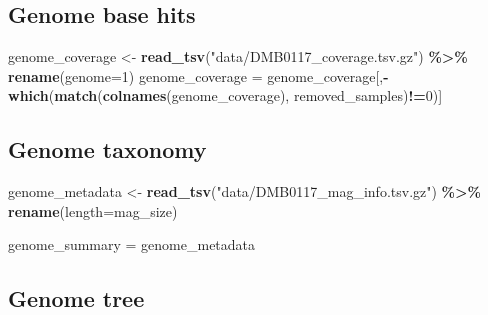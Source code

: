 \documentclass[
]{book}
\newenvironment{Shaded}{\begin{snugshade}}{\end{snugshade}}
\newcommand{\AttributeTok}[1]{\textcolor[rgb]{0.13,0.29,0.53}{#1}}
\newcommand{\CommentTok}[1]{\textcolor[rgb]{0.56,0.35,0.01}{\textit{#1}}}
\newcommand{\DecValTok}[1]{\textcolor[rgb]{0.00,0.00,0.81}{#1}}
\newcommand{\FunctionTok}[1]{\textcolor[rgb]{0.13,0.29,0.53}{\textbf{#1}}}
\newcommand{\NormalTok}[1]{#1}
\newcommand{\OtherTok}[1]{\textcolor[rgb]{0.56,0.35,0.01}{#1}}
\newcommand{\SpecialCharTok}[1]{\textcolor[rgb]{0.81,0.36,0.00}{\textbf{#1}}}
\newcommand{\StringTok}[1]{\textcolor[rgb]{0.31,0.60,0.02}{#1}}
\begin{document}
\subsection{Genome base hits}\label{genome-base-hits}

\begin{Shaded}
\begin{Highlighting}[]
\NormalTok{genome\_coverage }\OtherTok{\textless{}{-}} \FunctionTok{read\_tsv}\NormalTok{(}\StringTok{"data/DMB0117\_coverage.tsv.gz"}\NormalTok{) }\SpecialCharTok{\%\textgreater{}\%}
    \FunctionTok{rename}\NormalTok{(}\AttributeTok{genome=}\DecValTok{1}\NormalTok{)}
\NormalTok{genome\_coverage }\OtherTok{=}\NormalTok{ genome\_coverage[,}\SpecialCharTok{{-}}\FunctionTok{which}\NormalTok{(}\FunctionTok{match}\NormalTok{(}\FunctionTok{colnames}\NormalTok{(genome\_coverage), removed\_samples)}\SpecialCharTok{!=}\DecValTok{0}\NormalTok{)]}
\end{Highlighting}
\end{Shaded}

\subsection{Genome taxonomy}\label{genome-taxonomy}

\begin{Shaded}
\begin{Highlighting}[]
\NormalTok{genome\_metadata }\OtherTok{\textless{}{-}} \FunctionTok{read\_tsv}\NormalTok{(}\StringTok{"data/DMB0117\_mag\_info.tsv.gz"}\NormalTok{) }\SpecialCharTok{\%\textgreater{}\%}
    \FunctionTok{rename}\NormalTok{(}\AttributeTok{length=}\NormalTok{mag\_size)}

\NormalTok{genome\_summary }\OtherTok{=}\NormalTok{ genome\_metadata}
\end{Highlighting}
\end{Shaded}

\subsection{Genome tree}\label{genome-tree}

\begin{Shaded}
\end{Shaded}
\end{document}

